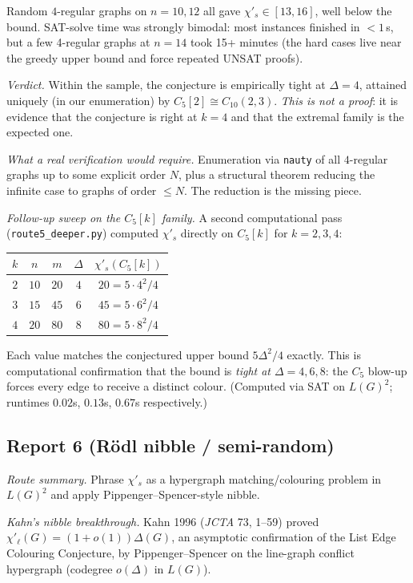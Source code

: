 \documentclass[11pt]{article}
\newcommand{\sci}{\chi'_s}
\begin{document}
Random $4$-regular graphs on $n = 10, 12$ all gave
$\sci \in [13, 16]$, well below the bound. SAT-solve time was
strongly bimodal: most instances finished in $< 1$\,s, but a few
4-regular graphs at $n = 14$ took 15+ minutes (the hard cases live
near the greedy upper bound and force repeated UNSAT proofs).

\emph{Verdict.} Within the sample, the conjecture is empirically
tight at $\Delta = 4$, attained uniquely (in our enumeration) by
$C_5[2] \cong C_{10}(2,3)$. \emph{This is not a proof}: it is
evidence that the conjecture is right at $k = 4$ and that the
extremal family is the expected one.

\emph{What a real verification would require.} Enumeration via
\texttt{nauty} of all $4$-regular graphs up to some explicit order
$N$, plus a structural theorem reducing the infinite case to graphs
of order $\leq N$. The reduction is the missing piece.

\emph{Follow-up sweep on the $C_5[k]$ family.} A second computational
pass (\verb|route5_deeper.py|) computed $\sci$ directly on $C_5[k]$
for $k = 2, 3, 4$:
\begin{center}
\begin{tabular}{c|c|c|c|c}
$k$ & $n$ & $m$ & $\Delta$ & $\sci(C_5[k])$ \\
\hline
$2$ & $10$ & $20$ & $4$ & $20 = 5 \cdot 4^2/4$ \\
$3$ & $15$ & $45$ & $6$ & $45 = 5 \cdot 6^2/4$ \\
$4$ & $20$ & $80$ & $8$ & $80 = 5 \cdot 8^2/4$ \\
\end{tabular}
\end{center}
Each value matches the conjectured upper bound $5\Delta^2/4$ exactly.
This is computational confirmation that the bound is \emph{tight at
$\Delta = 4, 6, 8$}: the $C_5$ blow-up forces every edge to receive
a distinct colour. (Computed via SAT on $L(G)^2$; runtimes
$0.02$s, $0.13$s, $0.67$s respectively.)

\subsection*{Report 6 (R\"odl nibble / semi-random)}

\emph{Route summary.} Phrase $\sci$ as a hypergraph matching/colouring
problem in $L(G)^2$ and apply Pippenger--Spencer-style nibble.

\emph{Kahn's nibble breakthrough.} Kahn 1996 (\emph{JCTA} 73, 1--59)
proved $\chi'_\ell(G) = (1+o(1))\Delta(G)$, an asymptotic confirmation
of the List Edge Colouring Conjecture, by Pippenger--Spencer on the
line-graph conflict hypergraph (codegree $o(\Delta)$ in $L(G)$).
\end{document}
